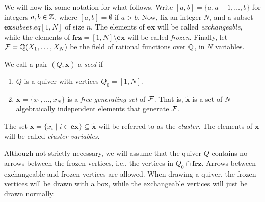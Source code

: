 \documentclass{article}
\newcommand{\ex}{\mathbf{ex}}
\newcommand{\frz}{\mathbf{frz}}
\newcommand{\bx}{\mathbf{x}}
\newcommand{\tbx}{\tilde{\bx}}
\begin{document}
We will now fix some notation for what follows. Write $[a,b] = \{a, a + 1, \dots, b\}$
for integers $a,b \in \mathbb{Z}$, where $[a,b] = \emptyset$ if $a > b$. Now, fix an integer
$N$, and a subset $\ex subset.eq [1, N]$ of size $n$. The elements of $\ex$ will be
called \emph{exchangeable}, while the elements of $\frz = [1, N]
	\setminus \ex$ will be called \emph{frozen}. Finally, let $\mathcal{F} = \mathbb{Q}
	(X_1, \dots, X_N)$ be the field of rational functions over $\mathbb{Q}$, in $N$ variables.

\begin{definition}
	We call a pair $(Q, \tbx)$ a \emph{seed} if
	\begin{enumerate}
		\item $Q$ is a quiver with vertices $Q_0 = [1, N]$.
		\item $\tbx = \{x_1, \dots, x_N\}$ is a \emph{free generating set} of $\mathcal{F}$. That is, $\tbx$ is a set of $N$ algebraically independent elements that generate $\mathcal{F}$.
	\end{enumerate}
	The set $\bx = \{x_i \mid i \in \ex\} \subseteq \tbx$ will be referred to as the \emph{cluster}. The elements of $\bx$ will be called \emph{cluster variables}.
\end{definition}

Although not strictly necessary, we will assume that the quiver $Q$ contains no arrows
between the frozen vertices, i.e., the vertices in $Q_0 \cap \frz$. Arrows between
exchangeable and frozen vertices are allowed. When drawing a quiver, the frozen
vertices will be drawn with a box, while the exchangeable vertices will just be drawn
normally.
\end{document}
